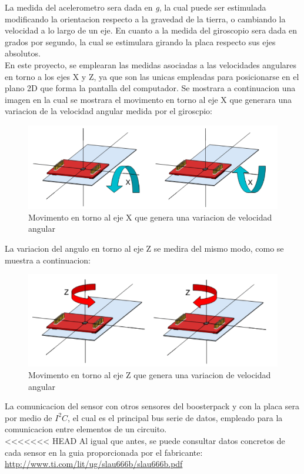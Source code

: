 \documentclass[a4paper,twoside]{article}
\begin{document}
La medida del acelerometro sera dada en \textit{g}, la cual puede ser estimulada modificando la orientacion respecto a la gravedad de la tierra, o cambiando la velocidad a lo largo de un eje. En cuanto a la medida del giroscopio sera dada en grados por segundo, la cual se estimulara girando la placa respecto sus ejes absolutos. \\
En este proyecto, se emplearan las medidas asociadas a las velocidades angulares en torno a los ejes X y Z, ya que son las unicas empleadas para posicionarse en el plano 2D que forma la pantalla del computador. Se mostrara a continuacion una imagen en la cual se mostrara el movimento en torno al eje X que generara una variacion de la velocidad angular medida por el giroscpio:\\
\begin{figure}[h!]
 \centering
 \includegraphics[width=.6\textwidth]{../images/mov_axisX_bmi}
 \caption{Movimento en torno al eje X que genera una variacion de velocidad angular}
\end{figure}

La variacion del angulo en torno al eje Z se medira del mismo modo, como se muestra a continuacion: \\
\begin{figure}[h!]
 \centering
 \includegraphics[width=.6\textwidth]{../images/mov_axisZ_bmi}
 \caption{Movimento en torno al eje Z que genera una variacion de velocidad angular}
\end{figure}

\newpage
La comunicacion del sensor con otros sensores del boosterpack y con la placa sera por medio de $I^2C$, el cual es el principal bus serie de datos, empleado para la comunicacion entre elementos de un circuito. \\

<<<<<<< HEAD
Al igual que antes, se puede consultar datos concretos de cada sensor en la guia proporcionada por el fabricante:
\url{http://www.ti.com/lit/ug/slau666b/slau666b.pdf}
\end{document}
